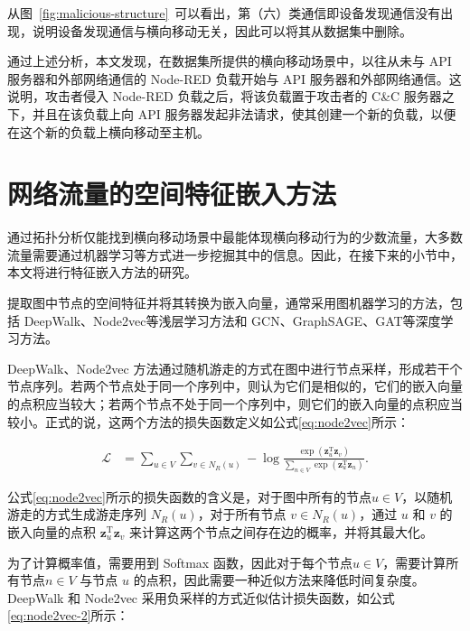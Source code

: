{\begin{figure}[t]
\end{figure}

从图~\ref{fig:malicious-structure}~可以看出，第（六）类通信即设备发现通信没有出现，说明设备发现通信与横向移动无关，因此可以将其从数据集中删除。

通过上述分析，本文发现，在数据集所提供的横向移动场景中，以往从未与 API 服务器和外部网络通信的 Node-RED 负载开始与 API 服务器和外部网络通信。这说明，攻击者侵入 Node-RED 负载之后，将该负载置于攻击者的 C\&C 服务器之下，并且在该负载上向 API 服务器发起非法请求，使其创建一个新的负载，以便在这个新的负载上横向移动至主机。

\section{网络流量的空间特征嵌入方法}
\label{sec:spatial}

通过拓扑分析仅能找到横向移动场景中最能体现横向移动行为的少数流量，大多数流量需要通过机器学习等方式进一步挖掘其中的信息。因此，在接下来的小节中，本文将进行特征嵌入方法的研究。

提取图中节点的空间特征并将其转换为嵌入向量，通常采用图机器学习的方法，包括 DeepWalk\citep{perozzi2014deepwalk}、Node2vec\citep{grover2016node2vec}等浅层学习方法和 GCN\citep{kipf2016semi}、GraphSAGE\citep{hamilton2017inductive}、GAT\citep{velivckovic2017graph}等深度学习方法。

DeepWalk、Node2vec 方法通过随机游走的方式在图中进行节点采样，形成若干个节点序列。若两个节点处于同一个序列中，则认为它们是相似的，它们的嵌入向量的点积应当较大；若两个节点不处于同一个序列中，则它们的嵌入向量的点积应当较小。正式的说，这两个方法的损失函数定义如公式\eqref{eq:node2vec}所示：

\begin{equation}
    \label{eq:node2vec}
    \begin{split}
        \mathcal{L} &= \sum_{u \in V} \sum_{v \in N_R(u)} - \log\frac{\exp(\mathbf{z}_u^{\mathrm{T}} \mathbf{z}_v)}{\sum_{n \in V}\exp(\mathbf{z}_u^{\mathrm{T}}\mathbf{z}_n)}.
    \end{split}
\end{equation}

公式\eqref{eq:node2vec}所示的损失函数的含义是，对于图中所有的节点$u \in V$，以随机游走的方式生成游走序列 $N_R(u)$，对于所有节点 $v \in N_R(u)$，通过 $u$ 和 $v$ 的嵌入向量的点积 $\mathbf{z}_u^{\mathrm{T}} \mathbf{z}_v$ 来计算这两个节点之间存在边的概率，并将其最大化。

为了计算概率值，需要用到 Softmax 函数，因此对于每个节点$u \in V$，需要计算所有节点$n \in V$ 与节点 $u$ 的点积，因此需要一种近似方法来降低时间复杂度。DeepWalk 和 Node2vec 采用负采样的方式近似估计损失函数，如公式\eqref{eq:node2vec-2}所示：

}
